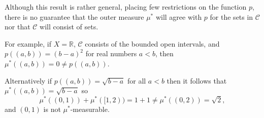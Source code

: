 \documentclass[12pt]{article}
\begin{document}
Although this result is rather general, placing few restrictions on the function $p$, there is no guarantee that the outer measure $\mu^*$ will agree with $p$ for the sets in $\mathcal{C}$ nor that $\mathcal{C}$ will consist of  sets.

For example, if $X=\mathbb{R}$, $\mathcal{C}$ consists of the bounded open intervals, and $p((a,b))=(b-a)^2$ for real numbers $a<b$, then $\mu^*((a,b))=0\not=p((a,b))$.

Alternatively if $p((a,b))=\sqrt{b-a}$ for all $a<b$ then it follows that $\mu^*((a,b))=\sqrt{b-a}$ so
\begin{equation*}
\mu^*((0,1))+\mu^*([1,2))=1+1\not=\mu^*((0,2))=\sqrt{2},
\end{equation*}
and $(0,1)$ is not $\mu^*$-measurable.




\end{document}
